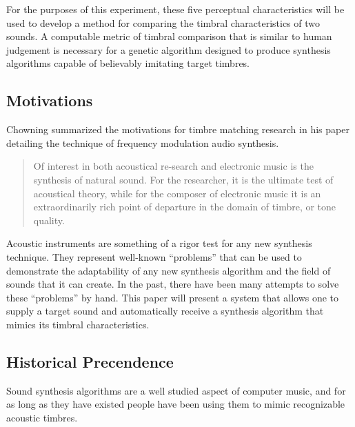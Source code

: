 \documentclass[12pt]{article}
\begin{document}
For the purposes of this experiment, these five perceptual characteristics will be used to develop a method for comparing the timbral characteristics of two sounds. A computable metric of timbral comparison that is similar to human judgement is necessary for a genetic algorithm designed to produce synthesis algorithms capable of believably imitating target timbres.



\subsection{Motivations}\label{TMMOTIVATION}
Chowning summarized the motivations for timbre matching research in his paper detailing the technique of frequency modulation audio synthesis.
\begin{quote}
Of interest in both acoustical re-search and electronic music is the synthesis of natural sound. For the researcher, it is the ultimate test of acoustical theory, while for the composer of electronic music it is an extraordinarily rich point of departure in the domain of timbre, or tone quality. \citep{chowning1973synthesis}
\end{quote}
Acoustic instruments are something of a rigor test for any new synthesis technique. They represent well-known ``problems'' that can be used to demonstrate the adaptability of any new synthesis algorithm and the field of sounds that it can create. In the past, there have been many attempts to solve these ``problems'' by hand. This paper will present a system that allows one to supply a target sound and automatically receive a synthesis algorithm that mimics its timbral characteristics.
	

\subsection{Historical Precendence}\label{TMHISTORY}
Sound synthesis algorithms are a well studied aspect of computer music, and for as long as they have existed people have been using them to mimic recognizable acoustic timbres.
\end{document}
